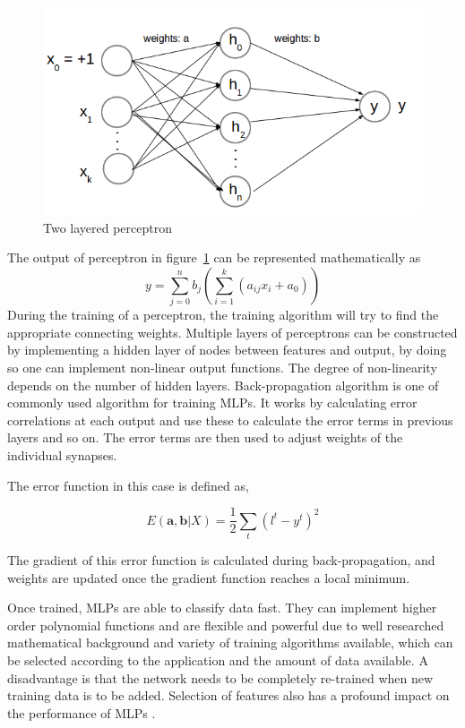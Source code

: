 \begin{figure}[h]
  \begin{center}
    \captionsetup{justification=centering}
    \includegraphics[scale=0.45]{figures/perceptron.png}
    \caption{Two layered perceptron}
    \label{fig:perceptron}
  \end{center}
\end{figure}

The output of perceptron in figure~\ref{fig:perceptron} can be represented mathematically as
\[ y = \sum\limits_{j=0}^n b_j (\sum\limits_{i=1}^k (a_{ij}x_i + a_0))\]
During the training of a perceptron, the training algorithm will try to find the appropriate connecting weights. Multiple layers of perceptrons can be constructed by implementing a hidden layer of nodes between features and output, by doing so one can implement non-linear output functions. The degree of non-linearity depends on the number of hidden layers. Back-propagation algorithm \cite{Rumelhart1985} is one of commonly used algorithm for training MLPs. It works by calculating error correlations at each output and use these to calculate the error terms in previous layers and so on. The error terms are then used to adjust weights of the individual synapses. 

The error function in this case is defined as,

\[ E(\boldsymbol{a},\boldsymbol{b}|X) = \frac{1}{2} \sum\limits_{t} (l^t - y^t)^2\]

The gradient of this error function is calculated during back-propagation, and weights are updated once the gradient function reaches a local minimum.

Once trained, MLPs are able to classify data fast. They can implement higher order polynomial functions and are flexible and powerful due to well researched mathematical background and variety of training algorithms available, which can be selected according to the application and the amount of data available. A disadvantage is that the network needs to be completely re-trained when new training data is to be added. Selection of features also has a profound impact on the performance of MLPs \cite{Kavzoglu2002, El-Khatib2010}.

